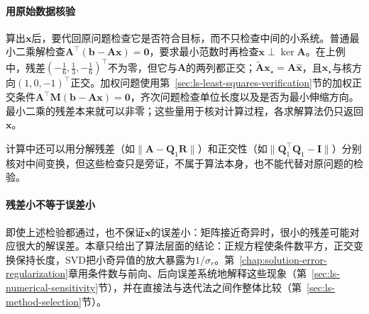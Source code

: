 \paragraph{用原始数据核验}
算出$\bm x$后，要代回原问题检查它是否符合目标，而不只检查中间的小系统。普通最小二乘解检查$\bm A^\top(\bm b-\bm A\bm x)=\bm0$，要求最小范数时再检查$\bm x\perp\ker\bm A$。在上例中，残差$(-\tfrac16,\tfrac13,-\tfrac16)^\top$不为零，但它与$\bm A$的两列都正交；$\widetilde{\bm A}\bm x_\star=\bm A\hat{\bm x}$，且$\bm x_\star$与核方向$(1,0,-1)^\top$正交。加权问题使用第~\ref{sec:ls-least-squares-verification}节的加权正交条件$\bm A^\top\bm M(\bm b-\bm A\bm x)=\bm0$，齐次问题检查单位长度以及是否为最小伸缩方向。最小二乘的残差本来就可以非零；这些量用于核对计算过程，各求解算法仍只返回$\bm x$。

计算中还可以用分解残差（如$\lVert\bm A-\bm Q_1\bm R\rVert$）和正交性（如$\lVert\bm Q_1^\top\bm Q_1-\bm I\rVert$）分别核对中间变换，但这些检查只是旁证，不属于算法本身，也不能代替对原问题的检验。

\paragraph{残差小不等于误差小}
即使上述检验都通过，也不保证$\bm x$的误差小：矩阵接近奇异时，很小的残差可能对应很大的解误差。本章只给出了算法层面的结论：正规方程使条件数平方，正交变换保持长度，SVD把小奇异值的放大暴露为$1/\sigma_r$。第~\ref{chap:solution-error-regularization}章用条件数与前向、后向误差系统地解释这些现象（第~\ref{sec:ls-numerical-sensitivity}节），并在直接法与迭代法之间作整体比较（第~\ref{sec:ls-method-selection}节）。
